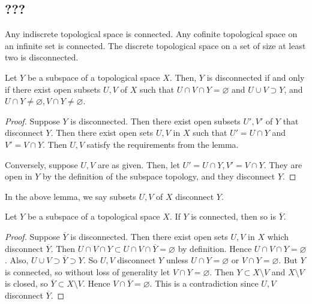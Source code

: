 \subsection{???}
\begin{example}
	Any indiscrete topological space is connected.
	Any cofinite topological space on an infinite set is connected.
	The discrete topological space on a set of size at least two is disconnected.
\end{example}
\begin{lemma}
	Let \( Y \) be a subspace of a topological space \( X \).
	Then, \( Y \) is disconnected if and only if there exist open subsets \( U, V \) of \( X \) such that \( U \cap V \cap Y = \varnothing \) and \( U \cup V \supset Y \), and \( U \cap Y \neq \varnothing, V \cap Y \neq \varnothing \).
\end{lemma}
\begin{proof}
	Suppose \( Y \) is disconnected.
	Then there exist open subsets \( U', V' \) of \( Y \) that disconnect \( Y \).
	Then there exist open sets \( U, V \) in \( X \) such that \( U' = U \cap Y \) and \( V' = V \cap Y \).
	Then \( U, V \) satisfy the requirements from the lemma.

	Conversely, suppose \( U, V \) are as given.
	Then, let \( U' = U \cap Y, V' = V \cap Y \).
	They are open in \( Y \) by the definition of the subspace topology, and they disconnect \( Y \).
\end{proof}
\begin{remark}
	In the above lemma, we say subsets \( U, V \) of \( X \) disconnect \( Y \).
\end{remark}
\begin{proposition}
	Let \( Y \) be a subspace of a topological space \( X \).
	If \( Y \) is connected, then so is \( \overline Y \).
\end{proposition}
\begin{proof}
	Suppose \( \overline Y \) is disconnected.
	Then there exist open sets \( U, V \) in \( X \) which disconnect \( \overline Y \).
	Then \( U \cap V \cap Y \subset U \cap V \cap \overline Y = \varnothing \) by definition.
	Hence \( U \cap V \cap Y = \varnothing \).
	Also, \( U \cup V \supset \overline Y \supset Y \).
	So \( U, V \) disconnect \( Y \) unless \( U \cap Y = \varnothing \) or \( V \cap Y = \varnothing \).
	But \( Y \) is connected, so without loss of generality let \( V \cap Y = \varnothing \).
	Then \( Y \subset X \setminus V \) and \( X \setminus V \) is closed, so \( \overline Y \subset X \setminus V \).
	Hence \( V \cap \overline Y = \varnothing \).
	This is a contradiction since \( U, V \) disconnect \( \overline Y \).
\end{proof}
